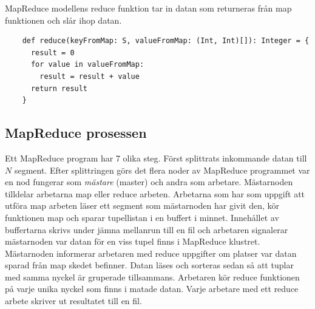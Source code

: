 MapReduce modellens reduce funktion tar in datan som returneras från map funktionen och slår ihop datan. 

\begin{verbatim}
    def reduce(keyFromMap: S, valueFromMap: (Int, Int)[]): Integer = {
      result = 0
      for value in valueFromMap:
        result = result + value
      return result
    }
\end{verbatim}

\subsection{MapReduce prosessen}

Ett MapReduce program har 7 olika steg. Först splittrats inkommande datan till $N$ segment. Efter splittringen
görs det flera noder av MapReduce programmet var en nod fungerar som \textit{mästare} (master) och andra
som arbetare. Mästarnoden tilldelar arbetarna map eller reduce arbeten. Arbetarna som har som uppgift att utföra map arbeten
läser ett segment som mästarnoden har givit den, kör funktionen map och sparar tupellistan i en buffert i minnet.
Innehållet av buffertarna skrivs under jämna mellanrun till en fil och arbetaren signalerar mästarnoden var datan för en viss
tupel finns i MapReduce klustret. Mästarnoden informerar arbetaren med reduce uppgifter om platser var datan sparad från map skedet
befinner. Datan läses och sorteras sedan så att tuplar med samma nyckel är gruperade tillsammans. Arbetaren kör reduce funktionen på varje
unika nyckel som finns i matade datan. Varje arbetare med ett reduce arbete skriver ut resultatet till en fil.

